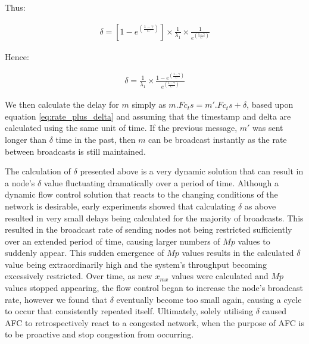     Thus:
    
     \begin{equation}
		     \begin{aligned}
		         \delta = [1 - e ^{ ({\frac{1-\gamma}{C}})}] \times \frac{1}{\lambda_1} \times \frac{1}{e ^{ ({\frac{1-\gamma}{C}})}}
		     \end{aligned}
    \end{equation}
    
    Hence:
    
        \begin{equation}
		     \begin{aligned}
		         \delta = \frac{1}{\lambda_1}  \times   \frac{1 - e ^{ ({\frac{1-\gamma}{C}})}}{e ^{ ({\frac{1-\gamma}{C}})}}
		     \end{aligned}
    \end{equation}
    
    We then calculate the delay for $m$ simply as $m.Fc_ts = m'.Fc_ts + \delta$, based upon equation \ref{eq:rate_plus_delta} and assuming that the timestamp and delta are calculated using the same unit of time.  If the previous message, $m'$ was sent longer than $\delta$ time in the past, then $m$ can be broadcast instantly as the rate between broadcasts is still maintained.  
    
    The calculation of $\delta$ presented above is a very dynamic solution that can result in a node's $\delta$ value fluctuating dramatically over a period of time.  Although a dynamic flow control solution that reacts to the changing conditions of the network is desirable, early experiments showed that calculating $\delta$ as above resulted in very small delays being calculated for the majority of broadcasts.  This resulted in the broadcast rate of sending nodes not being restricted sufficiently over an extended period of time, causing larger numbers of $Mp$ values to suddenly appear. This sudden emergence of $Mp$ values results in the calculated $\delta$ value being extraordinarily high and the system's throughput becoming excessively restricted.  Over time, as new $x_{mx}$ values were calculated and $Mp$ values stopped appearing, the flow control began to increase the node's broadcast rate, however we found that $\delta$ eventually become too small again, causing a cycle to occur that consistently repeated itself.  Ultimately, solely utilising $\delta$ caused AFC to retrospectively react to a congested network, when the purpose of AFC is to be proactive and stop congestion from occurring.  
    
